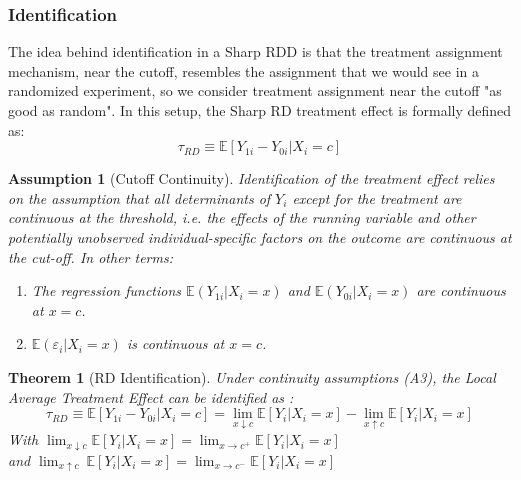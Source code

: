 \documentclass[12pt]{article}
\theoremstyle{plain}
\newtheorem{assumption}{Assumption}
\newtheorem{theorem}{Theorem}[section]
\theoremstyle{remark}
\begin{document}
\subsubsection{Identification}
The idea behind identification in a Sharp RDD is that the treatment assignment mechanism, near the cutoff, resembles the assignment that we would see in a randomized experiment, so we consider treatment assignment near the cutoff "as good as random". In this setup, the Sharp RD treatment effect is formally defined as: \[
\tau_{RD}\equiv \mathbb{E}\left[ Y_{1i}-Y_{0i} |X_i=c \right] 
\]
\begin{assumption}[Cutoff Continuity]
Identification of the treatment effect relies on the assumption that all determinants of $Y_i$ except for the treatment are continuous at the threshold, i.e. the effects of the running variable and other potentially unobserved individual-specific factors on the outcome are continuous at the cut-off. In other terms:
    \begin{enumerate}[label=\roman*.]
        \item The regression functions $\mathbb{E}(Y_{1i} |X_i=x)$ and $\mathbb{E}(Y_{0i} |X_i=x)$ are continuous at $x=c$.
        \item $\mathbb{E}(\varepsilon_i|X_i=x)$ is continuous at $x=c$.
    \end{enumerate}
\end{assumption}

\begin{theorem}[RD Identification]
    Under continuity assumptions (A3), the Local Average Treatment Effect can be identified as : 
    \begin{equation} 
        \tau_{RD}\equiv\mathbb{E}\left[Y_{1i} - Y_{0i} |X_{i}=c \right] = \lim_{x\downarrow c} \mathbb{E}\left[Y_{i} |X_{i}=x \right] - \lim_{x\uparrow c}\mathbb{E}\left[Y_{i}|X_{i}=x \right]
    \end{equation}
   {With} $\lim_{x\downarrow c}\mathbb{E}\left[Y_{i} |X_{i}=x \right]=\lim_{x\rightarrow c^+}\mathbb{E}\left[Y_{i} |X_{i}=x \right]$ \\{and} $\lim_{x\uparrow c}\ \mathbb{E}\left[Y_{i} |X_{i}=x \right]=\lim_{x\rightarrow c^-}\mathbb{E}\left[Y_{i} |X_{i}=x \right]$
\end{theorem}
\end{document}

